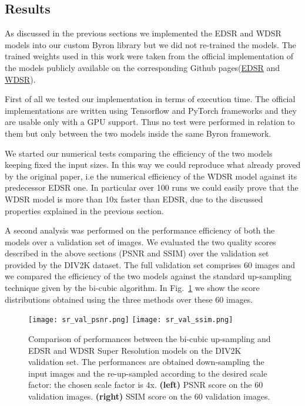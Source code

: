 \documentclass{standalone}
\begin{document}
\subsection[Results]{Results}\label{SR:results}

As discussed in the previous sections we implemented the EDSR and WDSR models into our custom \textsf{Byron} library but we did not re-trained the models.
The trained weights used in this work were taken from the official implementation of the models publicly available on the corresponding Github pages(\href{https://github.com/thstkdgus35/EDSR-PyTorch}{EDSR} and \href{https://github.com/JiahuiYu/wdsr_ntire2018}{WDSR}).

First of all we tested our implementation in terms of execution time.
The official implementations are written using \textsf{Tensorflow} and \textsf{PyTorch} frameworks and they are usable only with a GPU support.
Thus no test were performed in relation to them but only between the two models inside the same \textsf{Byron} framework.

We started our numerical tests comparing the efficiency of the two models keeping fixed the input sizes.
In this way we could reproduce what already proved by the original paper, i.e the numerical efficiency of the WDSR model against its predecessor EDSR one.
In particular over 100 runs we could easily prove that the WDSR model is more than 10x faster than EDSR, due to the discussed properties explained in the previous section.

A second analysis was performed on the performance efficiency of both the models over a validation set of images.
We evaluated the two quality scores described in the above sections (PSNR and SSIM) over the validation set provided by the DIV2K dataset.
The full validation set comprises 60 images and we compared the efficiency of the two models against the standard up-sampling technique given by the bi-cubic algorithm.
In Fig.~\ref{fig:sr_validation} we show the score distributions obtained using the three methods over these 60 images.

\begin{center}
\begin{figure}[htbp]
\centering
\texttt{[image: sr\_val\_psnr.png]}
\quad
\texttt{[image: sr\_val\_ssim.png]}
\caption{Comparison of performances between the bi-cubic up-sampling and EDSR and WDSR Super Resolution models on the DIV2K validation set.
The performances are obtained down-sampling the input images and the re-up-sampled according to the desired scale factor: the chosen scale factor is 4x.
\textbf{(left)} PSNR score on the 60 validation images.
\textbf{(right)} SSIM score on the 60 validation images.
}
\label{fig:sr_validation}
\end{figure}
\end{center}
\end{document}
